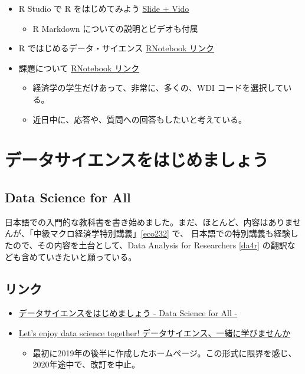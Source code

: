 \documentclass[
]{bxjsbook}
\providecommand{\tightlist}{%
  \setlength{\itemsep}{0pt}\setlength{\parskip}{0pt}}
\theoremstyle{definition}
\theoremstyle{definition}
\theoremstyle{definition}
\theoremstyle{definition}
\theoremstyle{remark}
\begin{document}
\begin{itemize}
\item
  R Studio で R をはじめてみよう \href{https://ds-sl.github.io/intro2r/getstarted.html}{Slide + Vido}

  \begin{itemize}
  \tightlist
  \item
    R Markdown についての説明とビデオも付属
  \end{itemize}
\item
  R ではじめるデータ・サイエンス \href{https://ds-sl.github.io/intro2r/eco232.nb.html}{RNotebook リンク}
\item
  課題について \href{https://ds-sl.github.io/intro2r/resp_assignment.nb.html}{RNotebook リンク}

  \begin{itemize}
  \tightlist
  \item
    経済学の学生だけあって、非常に、多くの、WDI コードを選択している。
  \item
    近日中に、応答や、質問への回答もしたいと考えている。
  \end{itemize}
\end{itemize}

\hypertarget{ds4aj}{%
\section{データサイエンスをはじめましょう}\label{ds4aj}}

\hypertarget{data-science-for-all}{%
\subsection*{Data Science for All}\label{data-science-for-all}}

日本語での入門的な教科書を書き始めました。まだ、ほとんど、内容はありませんが、「中級マクロ経済学特別講義」\ref{eco232} で、 日本語での特別講義も経験したので、その内容を土台として、Data Analysis for Researchers \ref{da4r} の翻訳なども含めていきたいと願っている。

\hypertarget{ux30eaux30f3ux30af}{%
\subsection{リンク}\label{ux30eaux30f3ux30af}}

\begin{itemize}
\item
  \href{https://icu-hsuzuki.github.io/ds4aj/index.html}{データサイエンスをはじめましょう - Data Science for All -}
\item
  \href{https://foods4all.github.io/}{Let's enjoy data science together! データサイエンス、一緒に学びませんか}

  \begin{itemize}
  \tightlist
  \item
    最初に2019年の後半に作成したホームページ。この形式に限界を感じ、2020年途中で、改訂を中止。
  \end{itemize}
\end{itemize}
\end{document}
